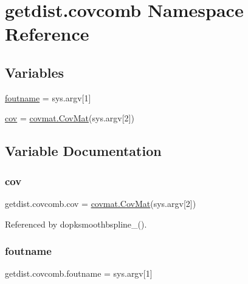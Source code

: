 \hypertarget{namespacegetdist_1_1covcomb}{}\section{getdist.\+covcomb Namespace Reference}
\label{namespacegetdist_1_1covcomb}
\subsection*{Variables}
\begin{DoxyCompactItemize}
\item 
\mbox{\hyperlink{namespacegetdist_1_1covcomb_a254eb9dbe49240a76819299f0ef74d7b}{foutname}} = sys.\+argv\mbox{[}1\mbox{]}
\item 
\mbox{\hyperlink{namespacegetdist_1_1covcomb_aa483c02374bbd644c33c8c2dd8534c98}{cov}} = \mbox{\hyperlink{classgetdist_1_1covmat_1_1CovMat}{covmat.\+Cov\+Mat}}(sys.\+argv\mbox{[}2\mbox{]})
\end{DoxyCompactItemize}


\subsection{Variable Documentation}
\mbox{\label{namespacegetdist_1_1covcomb_aa483c02374bbd644c33c8c2dd8534c98}} 
\subsubsection{\texorpdfstring{cov}{cov}}
{\footnotesize\ttfamily getdist.\+covcomb.\+cov = \mbox{\hyperlink{classgetdist_1_1covmat_1_1CovMat}{covmat.\+Cov\+Mat}}(sys.\+argv\mbox{[}2\mbox{]})}



Referenced by dopksmoothbspline\+\_\+().

\mbox{\label{namespacegetdist_1_1covcomb_a254eb9dbe49240a76819299f0ef74d7b}} 
\subsubsection{\texorpdfstring{foutname}{foutname}}
{\footnotesize\ttfamily getdist.\+covcomb.\+foutname = sys.\+argv\mbox{[}1\mbox{]}}


